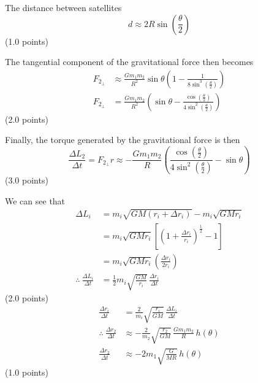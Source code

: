 \begin{description}

  The distance between satellites
  \[
    d \approx 2R\sin\left(\frac{\theta}{2}\right)
  \]
  \hfill(1.0 points)

  The tangential component of the gravitational force then becomes
  \begin{align*}
    F_{2_\perp} &\approx \frac{Gm_1 m_2}{R^2}\sin\theta
      \left(1 - \frac{1}{8\sin^3\left(\frac{\theta}{2}\right)}\right) \\
    F_{2_\perp} &= \frac{Gm_1 m_2}{R^2}
      \left(\sin\theta - \frac{\cos\left(\frac{\theta}{2}\right)}
        {4\sin^2\left(\frac{\theta}{2}\right)}\right)
  \end{align*}
  \hfill(2.0 points)

  Finally, the torque generated by the gravitational force is then
  \[
    \frac{\Delta L_2}{\Delta t} = F_{2_\perp} r
      \approx -\frac{Gm_1 m_2}{R}
      \left(\frac{\cos\left(\frac{\theta}{2}\right)}
        {4\sin^2\left(\frac{\theta}{2}\right)} - \sin\theta\right)
  \]
  \hfill(3.0 points)

\item[(d)] We can see that
  \begin{align*}
    \Delta L_i &= m_i\sqrt{GM(r_i + \Delta r_i)} - m_i\sqrt{GMr_i} \\
      &= m_i\sqrt{GMr_i}
         \left[\left(1 + \frac{\Delta r_i}{r_i}\right)^{\frac{1}{2}} - 1\right] \\
      &= m_i\sqrt{GMr_i}\left(\frac{\Delta r_i}{2r_i}\right) \\
    \therefore\ \frac{\Delta L_i}{\Delta t}
      &= \frac{1}{2}m_i\sqrt{\frac{GM}{r_i}}\,\frac{\Delta r_i}{\Delta t}
  \end{align*}
  \hfill(2.0 points)
  \begin{align*}
    \frac{\Delta r_i}{\Delta t}
      &= \frac{2}{m_i}\sqrt{\frac{r_i}{GM}}\,\frac{\Delta L_i}{\Delta t} \\
    \therefore\ \frac{\Delta r_2}{\Delta t}
      &\approx -\frac{2}{m_2}\sqrt{\frac{r_2}{GM}}\,
        \frac{Gm_1 m_2}{R}\,h(\theta) \\
    \frac{\Delta r_2}{\Delta t}
      &\approx -2m_1\sqrt{\frac{G}{MR}}\,h(\theta)
  \end{align*}
  \hfill(1.0 points)


\end{description}
